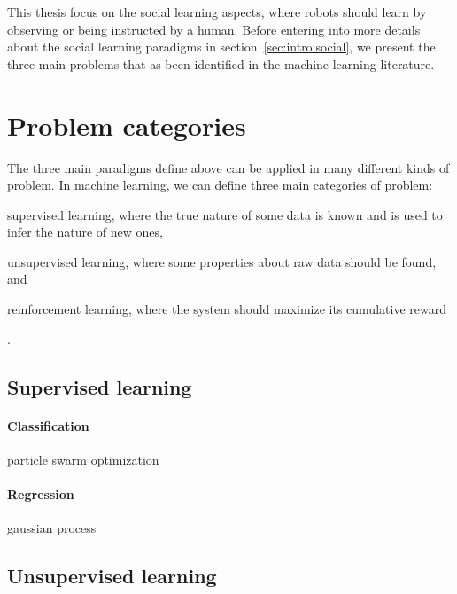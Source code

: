 \transition

This thesis focus on the social learning aspects, where robots should learn by observing or being instructed by a human. Before entering into more details about the social learning paradigms in section~\ref{sec:intro:social}, we present the three main  problems that as been identified in the machine learning literature.

\section{Problem categories}

The three main paradigms define above can be applied in many different kinds of problem. In machine learning, we can define three main categories of problem: \begin{inparaenum}[(a)] \item supervised learning, where the true nature of some data is known and is used to infer the nature of new ones, \item unsupervised learning, where some properties about raw data should be found, and \item reinforcement learning, where the system should maximize its cumulative reward \end{inparaenum}.

\subsection{Supervised learning}

\paragraph{Classification}

particle swarm optimization

\paragraph{Regression}

gaussian process

\subsection{Unsupervised learning}

